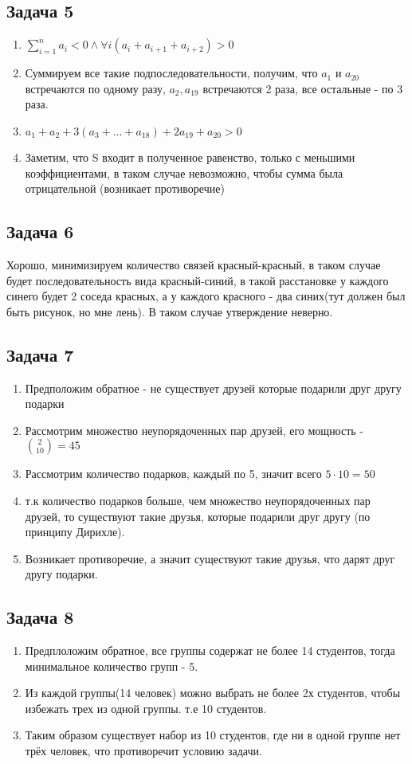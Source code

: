 \documentclass[a4paper,12pt]{article}
\begin{document}
\subsection{Задача 5}
\begin{enumerate}
    \item $\sum_{i=1}^{n}a_i < 0 \land \forall i(a_i+a_{i+1}+a_{i+2}) > 0$
    \item Суммируем все такие подпоследовательности, получим, что $a_1$ и $a_{20}$ встречаются по одному разу, $a_2, a_{19}$ встречаются 2 раза, все остальные - по 3 раза.
    \item $a_1 + a_2 + 3(a_3+...+a_{18}) + 2a_{19} + a_{20} > 0$
    \item Заметим, что S входит в полученное равенство, только с меньшими коэффициентами, в таком случае невозможно, чтобы сумма была отрицательной (возникает противоречие)
\end{enumerate}

\subsection{Задача 6}
Хорошо, минимизируем количество связей красный-красный, в таком случае будет последовательность вида красный-синий, в такой расстановке у каждого синего будет 2 соседа красных, а у каждого красного - два синих(тут должен был быть рисунок, но мне лень). В таком случае утверждение неверно. 


\subsection{Задача 7}
\begin{enumerate}
    \item Предположим обратное - не существует друзей которые подарили друг другу подарки
    \item Рассмотрим множество неупорядоченных пар друзей, его мощность - $\binom{2}{10} = 45$
    \item Рассмотрим количество подарков, каждый по 5, значит всего $5\cdot 10 = 50$
    \item т.к количество подарков больше, чем множество неупорядоченных пар друзей, то существуют такие друзья, которые подарили друг другу (по принципу Дирихле).
    \item Возникает противоречие, а значит существуют такие друзья, что дарят друг другу подарки.
\end{enumerate}

\subsection{Задача 8}
\begin{enumerate}
    \item Предплоложим обратное, все группы содержат не более 14 студентов, тогда минимальное количество групп - 5.
    \item Из каждой группы(14 человек) можно выбрать не более 2х студентов, чтобы избежать трех из одной группы. т.е 10 студентов.
    \item Таким образом существует набор из 10 студентов, где ни в одной группе нет трёх человек, что противоречит условию задачи.
\end{enumerate}
\end{document}
